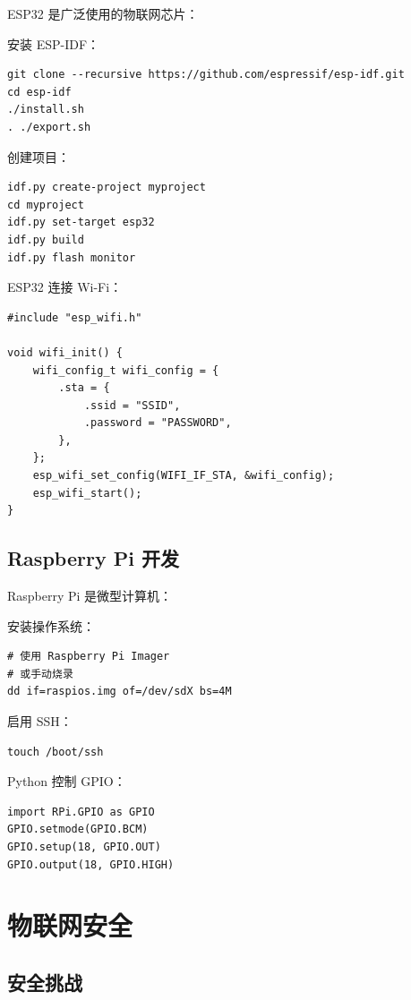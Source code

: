 \documentclass[12pt,UTF8]{ctexbook}
\begin{document}
ESP32 是广泛使用的物联网芯片：

安装 ESP-IDF：
\begin{verbatim}
git clone --recursive https://github.com/espressif/esp-idf.git
cd esp-idf
./install.sh
. ./export.sh
\end{verbatim}

创建项目：
\begin{verbatim}
idf.py create-project myproject
cd myproject
idf.py set-target esp32
idf.py build
idf.py flash monitor
\end{verbatim}

ESP32 连接 Wi-Fi：
\begin{verbatim}
#include "esp_wifi.h"

void wifi_init() {
    wifi_config_t wifi_config = {
        .sta = {
            .ssid = "SSID",
            .password = "PASSWORD",
        },
    };
    esp_wifi_set_config(WIFI_IF_STA, &wifi_config);
    esp_wifi_start();
}
\end{verbatim}

\section{Raspberry Pi 开发}
\label{sec:raspberry_pi_development}

Raspberry Pi 是微型计算机：

安装操作系统：
\begin{verbatim}
# 使用 Raspberry Pi Imager
# 或手动烧录
dd if=raspios.img of=/dev/sdX bs=4M
\end{verbatim}

启用 SSH：
\begin{verbatim}
touch /boot/ssh
\end{verbatim}

Python 控制 GPIO：
\begin{verbatim}
import RPi.GPIO as GPIO
GPIO.setmode(GPIO.BCM)
GPIO.setup(18, GPIO.OUT)
GPIO.output(18, GPIO.HIGH)
\end{verbatim}

\chapter{物联网安全}
\label{chap:iot_security}

\section{安全挑战}
\label{sec:security_challenges}
\end{document}
